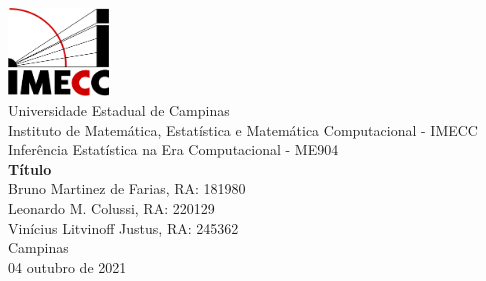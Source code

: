 \documentclass[
  12pt,
]{article}
\author{}
\date{\vspace{-2.5em}}
\begin{document}
\begin{titlepage} 
\begin{center} 

\vfill
\includegraphics[width=0.2\textwidth]{logo-imecc (1) (1).png}\\ [0.1in]

{\large Universidade Estadual de Campinas}\\ [0.2cm] 
{\large Instituto de Matemática, Estatística e Matemática Computacional - IMECC}\\ [0.2cm] 
{\large Inferência Estatística na Era Computacional - ME904}\\ [5cm]


{\bf \Large Título}\\ [6cm]

{\large Bruno Martinez de Farias, RA: 181980} \\ [0.2cm]
{\large Leonardo M. Colussi, RA: 220129} \\ [0.2cm]      
{\large Vinícius Litvinoff Justus, RA: 245362} \\[2cm] 

{\large Campinas}\\ [0.2cm]
{\large 04 outubro de 2021}

\end{center}
\end{titlepage}
\end{document}
